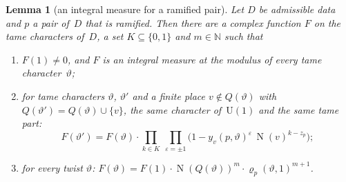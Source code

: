 \documentclass[11pt,a4paper]{article}
\newcommand{\m}[1]{\mbox{$#1$}}        %
\theoremstyle{plainx}
\newtheorem{lemma}[theorem]{Lemma}
\theoremstyle{uprightx}
\newcommand{\NN}{\mathbb{N}}
\newcommand{\Nm}{\operatorname{N}}
\begin{document}
\begin{lemma}[an integral measure for a ramified pair]\label{l:measure}
Let $D$ be admissible data and $p$ a pair of~$D$ that is ramified. Then there are a complex function $F$ on the
tame characters of~$D$, a set \m{K\subseteq\{0,1\}} and \m{m\in\NN} such that
\begin{enumerate}[label=\textup{(\arabic*)},leftmargin=2.3em,itemsep=1pt]
\item \m{F(1)\ne0}, and $F$ is an integral measure at the modulus of every tame character~$\vartheta$;
\item for tame characters $\vartheta$, $\vartheta'$ and a finite place \m{v\notin Q(\vartheta)} with
\m{Q(\vartheta')=Q(\vartheta)\cup\{v\}}, the same character of~$\mathrm{U}(1)$ and the same tame part:
\[F(\vartheta')=F(\vartheta)\cdot\prod_{k\in K}\ \prod_{\varepsilon=\pm1}\bigl(1-y_v(p,\vartheta)^{\varepsilon}\,\Nm(v)^{k-z_p}\bigr);\]
\item for every twist $\vartheta$: \m{F(\vartheta)=F(1)\cdot\Nm(Q(\vartheta))^{m}\cdot\varrho_p(\vartheta,1)^{m+1}}.
\end{enumerate}
\end{lemma}
\end{document}
